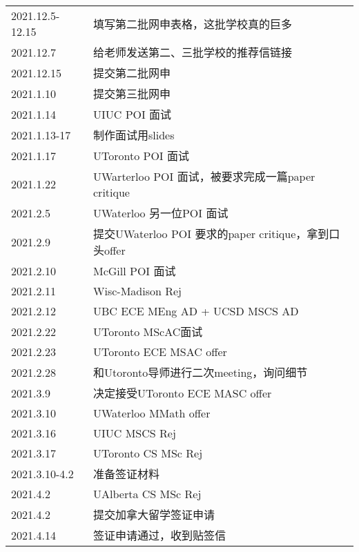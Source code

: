 \begin{longtable}{l|l}
2021.12.5-12.15 & 填写第二批网申表格，这批学校真的巨多                          \\
2021.12.7 & 给老师发送第二、三批学校的推荐信链接\\ 
2021.12.15      & 提交第二批网申                                     \\
2021.1.10     & 提交第三批网申                                     \\
2021.1.14       & UIUC POI 面试                                 \\
2021.1.13-17    & 制作面试用slides                                 \\
2021.1.17       & UToronto POI 面试                             \\
2021.1.22       & UWarterloo POI 面试，被要求完成一篇paper critique     \\
2021.2.5        & UWaterloo 另一位POI 面试                         \\
2021.2.9        & 提交UWaterloo POI 要求的paper critique，拿到口头offer \\
2021.2.10       & McGill POI 面试                               \\
2021.2.11       & Wisc-Madison Rej                          \\
2021.2.12       & UBC ECE MEng AD + UCSD MSCS AD            \\
2021.2.22       & UToronto MScAC面试                            \\
2021.2.23       & UToronto ECE MSAC offer                   \\
2021.2.28       & 和Utoronto导师进行二次meeting，询问细节                 \\
2021.3.9        & 决定接受UToronto ECE MASC offer                 \\
2021.3.10       & UWaterloo MMath offer                     \\
2021.3.16       & UIUC MSCS Rej                             \\
2021.3.17       & UToronto CS MSc Rej                       \\
2021.3.10-4.2   & 准备签证材料                                      \\
2021.4.2        & UAlberta CS MSc Rej                       \\
2021.4.2        & 提交加拿大留学签证申请                                 \\
2021.4.14       & 签证申请通过，收到贴签信\\\hline                  
\end{longtable}

